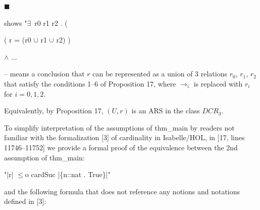  
 
\par\noindent  $\blacksquare$ 
 
shows "$\exists\,$ r0 r1 r2 . (\par
 
 
 
( r = (r0 $\cup$ r1 $\cup$ r2) )\par
 
 
 
$\wedge$ $...$\par
 
 
 
– means a conclusion that $r$ can be represented as a union of 3 relations $r_{0}$, $r_{1}$, $r_{2}$ that satisfy the conditions 1–6 of Proposition 17, where $\to_{i}$ is replaced with $r_{i}$ for $i=0,1,2$.\par
 
 
 
Equivalently, by Proposition 17, $(U,r)$ is an ARS in the class $DCR_{3}$.\par
 
 
  
 
 
To simplify interpretation of the assumptions of thm\_main by readers not familiar with the formalization [3] of cardinality in Isabelle/HOL, in [17, lines 11746–11752] we provide a formal proof of the equivalence between the 2nd assumption of thm\_main:\par
 
 
 
"|r| $\leq$o cardSuc |\{n::nat . True\}|"\par
 
 
 
and the following formula that does not reference any notions and notations defined in [3]:\par
 
 
 
